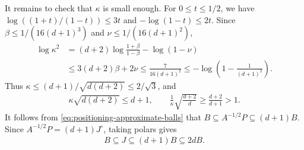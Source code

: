 \documentclass[12pt,cleveref]{jmlr}
\renewenvironment{proof}[1][\proofname]
{\par\noindent{\bfseries\upshape #1\ }}
{\jmlrQED}
\newcommand{\1}{\mathbf 1}
\begin{document}
\begin{proof}
    It remains to check that $\kappa$ is small enough. For
    $0\leq t\leq1/2$, we have
    $\log((1+t)/(1-t))\leq3t$ and $-\log(1-t)\leq2t$.
    Since $\beta\leq1/(16(d+1)^3)$ and $\nu\leq1/(16(d+1)^2)$,
    \begin{align}
        \log\kappa^2
        &=(d+2)\log\frac{1+\beta}{1-\beta}-\log(1-\nu)\\
        &\leq3(d+2)\beta+2\nu
        \leq\frac7{16(d+1)^2}
        \leq-\log\left(1-\frac1{(d+1)^2}\right).
    \end{align}
    Thus $\kappa\leq(d+1)/\sqrt{d(d+2)}\leq2/\sqrt3$, and
    \begin{align}
        \kappa\sqrt{d(d+2)}\leq d+1,
        \qquad \frac1\kappa\sqrt{\frac{d+2}{d}}
        \geq\frac{d+2}{d+1}>1.
    \end{align}
    It follows from \cref{eq:positioning-approximate-balls} that
    $B\subseteq A^{-1/2}P\subseteq(d+1)B$.
    Since $A^{-1/2}P=(d+1)J^\circ$, taking polars gives
    \begin{align}
        B\subseteq J\subseteq(d+1)B\subseteq2dB.
    \end{align}


\end{proof}
\end{document}
